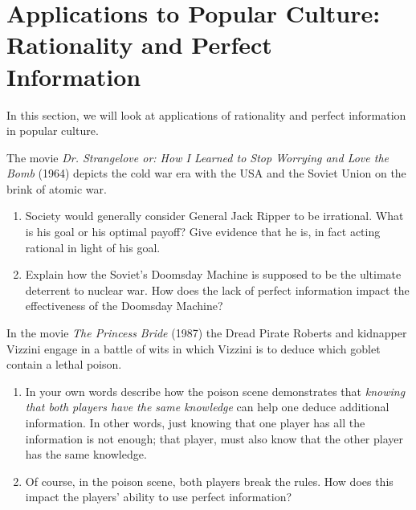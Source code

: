 
\section{Applications to Popular Culture: Rationality and Perfect Information}



\vspace{.1in}
In this section, we will look at applications of rationality and perfect information in popular culture.


The movie {\it Dr. Strangelove or: How I Learned to Stop Worrying and Love the Bomb} (1964) depicts the cold war era with the USA and the Soviet Union on the brink of atomic war. 

\begin{enumerate}
\item Society would generally consider General Jack Ripper to be irrational. What is his goal or his optimal payoff? Give evidence that he is, in fact acting rational in light of his goal. 

\item Explain how the Soviet's Doomsday Machine is supposed to be the ultimate deterrent to nuclear war. How does the lack of perfect information impact the effectiveness of the Doomsday Machine?
\end{enumerate}

In the movie {\it The Princess Bride} (1987) the Dread Pirate Roberts and kidnapper Vizzini engage in a battle of wits in which Vizzini is to deduce which goblet contain a lethal poison.

\begin{enumerate}

\item In your own words describe how the poison scene demonstrates that {\it knowing that both players have the same knowledge} can help  one deduce additional information. In other words, just knowing that one player has all the information is not enough; that player, must also know that the other player has the same knowledge.

\item Of course, in the poison scene, both players break the rules. How does this impact the players' ability to use perfect information? 

\end{enumerate}

